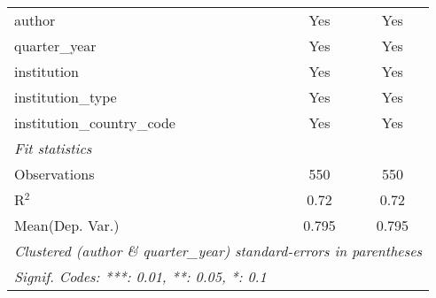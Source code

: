 \begin{tabular}{lcc}
   author                                   & Yes     & Yes\\  
   quarter\_year                            & Yes     & Yes\\  
   institution                              & Yes     & Yes\\  
   institution\_type                        & Yes     & Yes\\  
   institution\_country\_code               & Yes     & Yes\\  
   \midrule
   \emph{Fit statistics}\\
   Observations                             & 550     & 550\\  
   R$^2$                                    & 0.72    & 0.72\\  
Mean(Dep. Var.) & 0.795 & 0.795 \\
   \midrule \midrule
   \multicolumn{3}{l}{\emph{Clustered (author \& quarter\_year) standard-errors in parentheses}}\\
   \multicolumn{3}{l}{\emph{Signif. Codes: ***: 0.01, **: 0.05, *: 0.1}}\\
\end{tabular}
\par\endgroup
